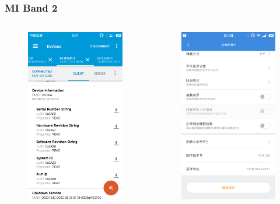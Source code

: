 \documentclass[UTF8]{ctexbeamer}
\begin{document}
\begin{frame}
  \frametitle{MI Band 2}
  \begin{columns}
  \begin{figure}
    \includegraphics[width=0.6\linewidth]{mi-band-info.png}
  \end{figure}
  \begin{figure}
    \includegraphics[width=0.6\linewidth]{mifit-app.png}
  \end{figure}
  \end{columns}
\end{frame}
\end{document}
